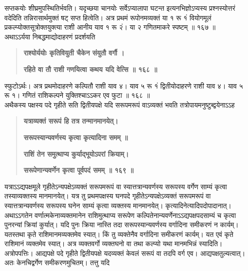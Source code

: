 \documentclass[11pt, openany]{book}
\begin{document}
\begin{sloppypar}
\hangindent=0.2in सप्तकयोः शीघ्रमुपस्थितिर्भवति। यदृच्छया चानयोः सर्वेऽप्यालापा घटन्त इत्यनभिज्ञोऽप्यस्य प्रश्नस्योत्तरं वदेदिति तन्निरासार्थमुक्तं षट् सप्त हित्वेति। अत्र प्रथमं रूपोनमव्यक्तं या १ रू १ं वियोगमूलं प्रकल्प्योक्तसूत्रोक्तयुक्त्या राशी आनीय याव १ रू २ं। या २ गणितमाकरे स्पष्टम् ॥ १६७ ॥\\

\hangindent=0.2in \hspace{0.2in}अथाऽऽर्यया निबद्धमाद्योदाहरणं प्रदर्शयति\textendash

\begin{quote}
\hspace{1in}\textbf{राश्योर्ययोः कृतिवियुती चैकेन संयुतौ वर्गौ ।}

\hspace{1in}\textbf{रहिते वा तौ राशी गणयित्वा कथय यदि वेत्सि ॥ १६८ ॥}
\end{quote}

\hangindent=0.2in \hspace{0.2in}स्फुटोऽर्थः। अत्र प्रथमोदाहरणे कल्पितौ राशी याव ४। याव ५ रू १ं द्वितीयोदाहरणे राशी याव ४। याव ५ रू १। गणितं राशिकल्पने युक्तिश्चाऽऽकर एव फुटा ॥ १६८ ॥\\

\hangindent=0.2in \hspace{0.2in}अथैकस्य पक्षस्य पदे गृहीते सति द्वितीयपक्षे यदि सरूपमरूपं वाऽव्यक्तं भवति तत्रोपायमनुष्टुब्द्वयेनाऽऽह\textendash

\begin{quote}
\hspace{1in}\textbf{यत्राव्यक्तं सरूपं हि तत्र तन्मानमानयेत्।}

\hspace{1in}\textbf{सरूपस्यान्यवर्णस्य कृत्वा कृत्यादिना समम् ॥}

\hspace{1in}\textbf{राशिं तेन समुत्थाप्य कुर्याद्भूयोऽपरां क्रियाम्।}

\hspace{1in}\textbf{सरूपेणान्यवर्णेन कृत्वा पूर्वपदं समम् ॥ १६९ ॥}
\end{quote}

\hangindent=0.2in \hspace{0.2in}यत्राऽऽद्यपक्षमूले गृहीतेऽन्यपक्षेऽव्यक्तं सरूपमरूपं वा स्यात्तत्रान्यवर्णस्य सरूपस्य वर्गेण साम्यं कृत्वा तस्याव्यक्तस्य मानमानयेत्। यत्र तु प्रथमपक्षस्य घनपदे गृहीतेऽन्यपक्षेऽव्यक्तं सरूपमरूपं वा स्यात्तत्रान्यवर्णस्य सरूपस्य घनेन साम्यं कृत्वा व्यक्तस्य मानमानयेत्। कृत्यादिनेत्यादिपदोपादानात्। अथाऽऽगतेन वर्णात्मकेनाव्यक्तमानेन राशिमुत्थाप्य सरूपेण कल्पितेनान्यवर्णेनाऽऽद्यपक्षपदसाम्यं च कृत्वा पुनरन्यां क्रियां कुर्यात्। यदि पुनः क्रिया नास्ति तदा सरूपस्यान्यवर्णस्य वर्गादिना समीकरणं न कार्यम्। यतस्तथा कृते राशिमानमव्यक्तमेव स्यात्। किं तु व्यक्तेनैव वर्गादिना समीकरणं कार्यम्। यत एवं कृते राशिमानं व्यक्तमेव स्यात्। अत्र व्यक्तवर्गो व्यक्तघनो वा तथा कल्प्यो यथा मानमभिन्नं स्यादिति।\\

\hangindent=0.2in \hspace{0.2in}अत्रोपपत्तिः। आद्यपक्षे पदे गृहीते द्वितीयपक्षे यदव्यक्तं केवलं सरूपं वा तदपि वर्ग एव। आद्यपक्षतुल्यत्वात्। अतः केनचिद्वर्गेण समीकरणमुचितम्। तत्तु यदि
\end{sloppypar}
\end{document}
